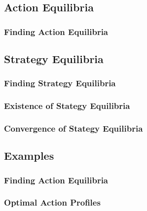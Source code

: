 \subsection{Action Equilibria}

\subsubsection{Finding Action Equilibria}

\subsection{Strategy Equilibria}

\subsubsection{Finding Strategy Equilibria}

\subsubsection{Existence of Stategy Equilibria}

\subsubsection{Convergence of Stategy Equilibria}

\subsection{Examples}
\subsubsection{Finding Action Equilibria}

\subsubsection{Optimal Action Profiles}

